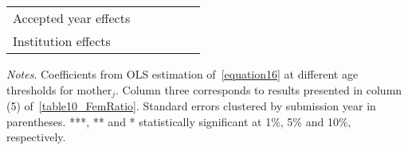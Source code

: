 \begin{table}[H]
\begin{threeparttable}
\begin{tabular}{p{4cm}SSSSS}
            Accepted year effects         &           {}   &           {}   &           {}   &           {}   &           {}   \\
            Institution effects           &           {}   &           {}   &           {}   &           {}   &           {}   \\
            \bottomrule
        \end{tabular}
        \begin{tablenotes}
            \tiny
            \item \textit{Notes}. Coefficients from OLS estimation of~\autoref{equation16} at different age thresholds for \(\text{mother}_j\). Column three corresponds to results presented in column (5) of~\autoref{table10_FemRatio}. Standard errors clustered by submission year in parentheses. ***, ** and * statistically significant at 1\%, 5\% and 10\%, respectively.
        \end{tablenotes}
    \end{threeparttable}
\end{table}